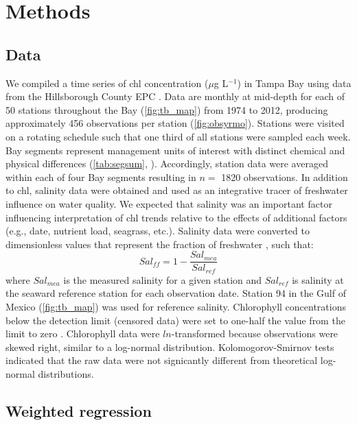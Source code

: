 \documentclass{svjour3}\usepackage[]{graphicx}\usepackage[]{color}
\newcommand{\mugl}{$\mu$g L$^{-1}$}
\begin{document}
\section{Methods}

\subsection{Data}

We compiled a time series of \ac{chl} concentration (\mugl) in Tampa Bay using data from the Hillsborough County \ac{EPC} \cite{TBEP11}.  Data are monthly at mid-depth for each of 50 stations throughout the Bay (\cref{fig:tb_map}) from 1974 to 2012, producing approximately 456 observations per station (\cref{fig:obsyrmo}).  Stations were visited on a rotating schedule such that one third of all stations were sampled each week.  Bay segments represent management units of interest with distinct chemical and physical differences (\cref{tab:segsum}, \cite{Lewis85}).  Accordingly, station data were averaged within each of four Bay segments resulting in $n=$ 1820 observations.  In addition to \ac{chl}, salinity data were obtained and used as an integrative tracer of freshwater influence on water quality.  We expected that salinity was an important factor influencing interpretation of \ac{chl} trends relative to the effects of additional factors (e.g., date, nutrient load, seagrass, etc.).  Salinity data were converted to dimensionless values that represent the fraction of freshwater \cite{Dyer73}, such that:
\begin{equation}
Sal_{ff} = 1 - \frac{Sal_{mea}}{Sal_{ref}}
\end{equation}
\noindent where $Sal_{mea}$ is the measured salinity for a given station and $Sal_{ref}$ is salinity at the seaward reference station for each observation date.  Station 94 in the Gulf of Mexico (\cref{fig:tb_map}) was used for reference salinity.  Chlorophyll concentrations below the detection limit (censored data) were set to one-half the value from the limit to zero \cite{Gilbert87}.  Chlorophyll data were $ln$-transformed because observations were skewed right, similar to a log-normal distribution.  Kolomogorov-Smirnov tests indicated that the raw data were not signicantly different from theoretical log-normal distributions.

\subsection{Weighted regression}
\end{document}
